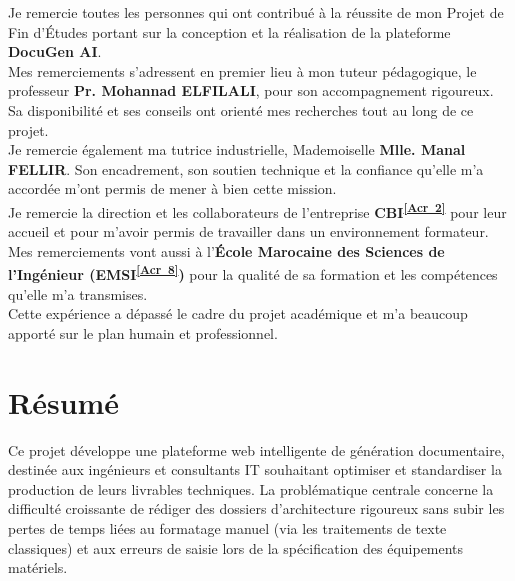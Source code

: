 \documentclass[12pt, a4paper]{report}
\newcommand{\acref}[1]{\textsuperscript{\hyperlink{acr:#1}{[Acr~#1]}}}
\newcommand{\EncadrantEcole}{Pr. Mohannad ELFILALI}
\newcommand{\EncadrantEntr}{Mlle. Manal FELLIR}
\begin{document}
\begin{onehalfspace}
    Je remercie toutes les personnes qui ont contribué à la réussite de mon Projet de Fin d'Études portant sur la conception et la réalisation de la plateforme \textbf{DocuGen AI}.
    \\

    Mes remerciements s'adressent en premier lieu à mon tuteur pédagogique, le professeur \textbf{\EncadrantEcole}, pour son accompagnement rigoureux. Sa disponibilité et ses conseils ont orienté mes recherches tout au long de ce projet.
    \\
    
    Je remercie également ma tutrice industrielle, Mademoiselle \textbf{\EncadrantEntr}. Son encadrement, son soutien technique et la confiance qu'elle m'a accordée m'ont permis de mener à bien cette mission.
    \\

    Je remercie la direction et les collaborateurs de l'entreprise \textbf{CBI\acref{2}} pour leur accueil et pour m'avoir permis de travailler dans un environnement formateur.
    \\
    
    Mes remerciements vont aussi à l'\textbf{École Marocaine des Sciences de l'Ingénieur (EMSI\acref{8})} pour la qualité de sa formation et les compétences qu'elle m'a transmises.
    \\
    Cette expérience a dépassé le cadre du projet académique et m'a beaucoup apporté sur le plan humain et professionnel.
\end{onehalfspace}

\chapter*{Résumé}

Ce projet développe une plateforme web intelligente de génération documentaire, destinée aux ingénieurs et consultants IT souhaitant optimiser et standardiser la production de leurs livrables techniques. La problématique centrale concerne la difficulté croissante de rédiger des dossiers d'architecture rigoureux sans subir les pertes de temps liées au formatage manuel (via les traitements de texte classiques) et aux erreurs de saisie lors de la spécification des équipements matériels.
\end{document}
